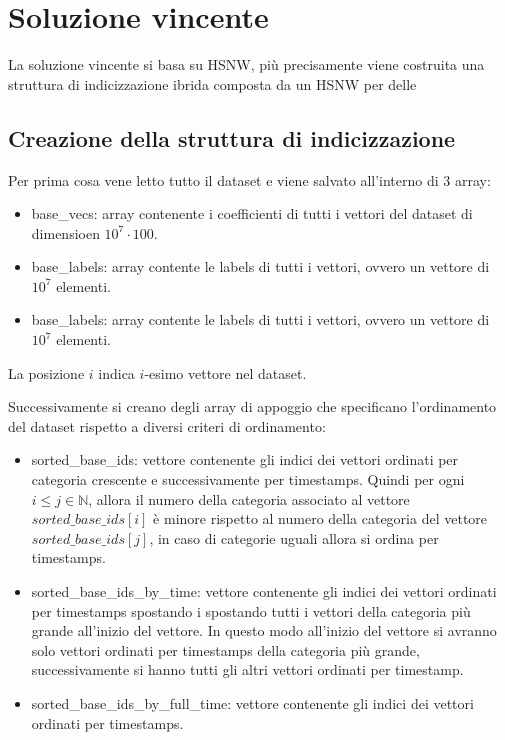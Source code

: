 \chapter{Soluzione vincente}
La soluzione vincente si basa su HSNW, più precisamente viene costruita una 
struttura di indicizzazione ibrida composta da un HSNW per delle

\section{Creazione della struttura di indicizzazione}
Per prima cosa vene letto tutto il dataset e viene salvato
all'interno di $3$ array:
\begin{itemize}
    \item base\_vecs: array contenente i coefficienti di tutti i vettori del dataset
    di dimensioen $10^7\cdot 100$.
    \item base\_labels: array contente le labels di tutti i vettori, ovvero un 
    vettore di $10^7$ elementi.
    \item base\_labels: array contente le labels di tutti i vettori, ovvero un 
    vettore di $10^7$ elementi.
\end{itemize} 

La posizione $i$ indica $i$-esimo vettore nel dataset.

Successivamente si creano degli array di appoggio che specificano l'ordinamento 
del dataset rispetto a diversi criteri di ordinamento:
\begin{itemize}
    \item sorted\_base\_ids: vettore contenente gli indici dei vettori ordinati 
    per categoria crescente e successivamente per timestamps. Quindi per ogni $i\le j\in \mathbb{N}$,
    allora il numero della categoria associato al vettore $sorted\_base\_ids[i]$
    è minore rispetto al numero della categoria del vettore $sorted\_base\_ids[j]$,
    in caso di categorie uguali allora si ordina per timestamps.
    \item sorted\_base\_ids\_by\_time: vettore contenente gli indici dei vettori ordinati 
    per timestamps spostando i spostando tutti i vettori della categoria più grande all'inizio 
    del vettore. In questo modo all'inizio del vettore si avranno solo vettori 
    ordinati per timestamps della categoria più grande, successivamente si hanno 
    tutti gli altri vettori ordinati per timestamp. 
    \item sorted\_base\_ids\_by\_full\_time: vettore contenente gli indici dei vettori ordinati 
    per timestamps.
\end{itemize}

